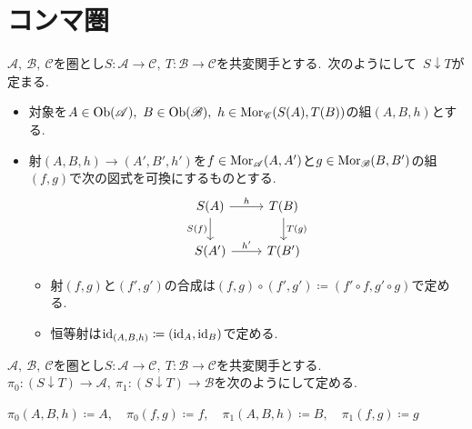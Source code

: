 
\section{コンマ圏}

\begin{definition} \label{def: CommaCategory}
$\mathscr{A},\ \mathscr{B},\ \mathscr{C}$を圏とし$S \colon \mathscr{A} \to \mathscr{C},\ T \colon \mathscr{B} \to \mathscr{C}$を共変関手とする.\
次のようにして\ $S \downarrow T$が定まる.
\begin{itemize}
	\item 対象を$A \in \operatorname{Ob}(\mathscr{A}),\ B \in \operatorname{Ob}(\mathscr{B}),\ h \in \operatorname{Mor}_{\mathscr{C}}(S(A), T(B))$の組$(A, B, h)$とする.
	\item 射$(A, B, h) \to (A', B', h')$を$f \in \operatorname{Mor}_{\mathscr{A}}(A, A')$と$g \in \operatorname{Mor}_{\mathscr{B}}(B, B')$の組$(f, g)$で次の図式を可換にするものとする.
\[\begin{tikzcd}
	{S(A)} & {T(B)} \\
	{S(A')} & {T(B')}
	\arrow["h", from=1-1, to=1-2]
	\arrow["{S(f)}"', from=1-1, to=2-1]
	\arrow["{T(g)}", from=1-2, to=2-2]
	\arrow["{h'}", from=2-1, to=2-2]
\end{tikzcd}\]
	\begin{itemize}
		\item 射$(f,g)$と$(f',g')$の合成は$(f,g) \circ (f',g') \coloneq (f' \circ f, g' \circ g)$で定める.
		\item 恒等射は$\operatorname{id}_{(A,B,h)} \coloneq (\operatorname{id}_{A}, \operatorname{id}_{B})$で定める.
	\end{itemize}
\end{itemize}
\end{definition}

\begin{definition} \label{def: projectionFunctor}
$\mathscr{A},\ \mathscr{B},\ \mathscr{C}$を圏とし$S \colon \mathscr{A} \to \mathscr{C},\ T \colon \mathscr{B} \to \mathscr{C}$を共変関手とする.\
\ $\pi_0 \colon (S \downarrow T) \to \mathscr{A},\ \pi_1 \colon (S \downarrow T) \to \mathscr{B}$を次のようにして定める.
\begin{center}
$\pi_0(A,B,h) \coloneq A,\quad \pi_0(f,g) \coloneq f,\quad \pi_1(A,B,h) \coloneq B,\quad \pi_1(f,g) \coloneq g$
\end{center}
\end{definition}

